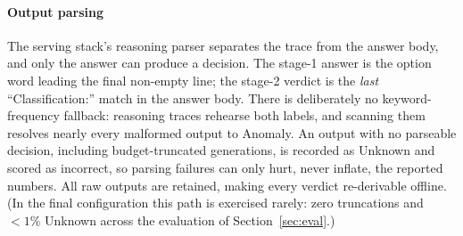 \documentclass[conference]{IEEEtran}
\begin{document}
\paragraph{Output parsing} The serving stack's reasoning parser separates the trace from the answer body, and only the answer can produce a decision. The stage-1 answer is the option word leading the final non-empty line; the stage-2 verdict is the \emph{last} ``Classification:'' match in the answer body. There is deliberately no keyword-frequency fallback: reasoning traces rehearse both labels, and scanning them resolves nearly every malformed output to Anomaly. An output with no parseable decision, including budget-truncated generations, is recorded as Unknown and scored as incorrect, so parsing failures can only hurt, never inflate, the reported numbers. All raw outputs are retained, making every verdict re-derivable offline. (In the final configuration this path is exercised rarely: zero truncations and $<1\%$ Unknown across the evaluation of Section~\ref{sec:eval}.)
\end{document}
